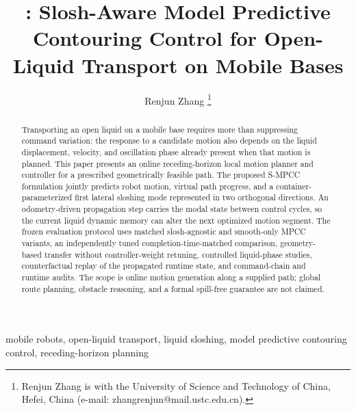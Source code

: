 \documentclass[journal]{IEEEtran}
\title{\SMPCC: Slosh-Aware Model Predictive Contouring Control for Open-Liquid Transport on Mobile Bases}
\author{Renjun Zhang%
\thanks{Renjun Zhang is with the University of Science and Technology of China,
Hefei, China (e-mail: zhangrenjun@mail.ustc.edu.cn).}}
\newcommand{\SMPCC}{S-MPCC}
\begin{document}
\maketitle

\begin{abstract}
Transporting an open liquid on a mobile base requires more than suppressing command variation: the response to a candidate motion also depends on the liquid displacement, velocity, and oscillation phase already present when that motion is planned.
This paper presents an online receding-horizon local motion planner and controller for a prescribed geometrically feasible path.
The proposed \SMPCC{} formulation jointly predicts robot motion, virtual path progress, and a container-parameterized first lateral sloshing mode represented in two orthogonal directions.
An odometry-driven propagation step carries the modal state between control cycles, so the current liquid dynamic memory can alter the next optimized motion segment.
The frozen evaluation protocol uses matched slosh-agnostic and smooth-only MPCC variants, an independently tuned completion-time-matched comparison, geometry-based transfer without controller-weight retuning, controlled liquid-phase studies, counterfactual replay of the propagated runtime state, and command-chain and runtime audits.
The scope is online motion generation along a supplied path; global route planning, obstacle reasoning, and a formal spill-free guarantee are not claimed.
\end{abstract}

\begin{IEEEkeywords}
mobile robots, open-liquid transport, liquid sloshing, model predictive contouring control, receding-horizon planning
\end{IEEEkeywords}

% 
% 


% 



\end{document}
